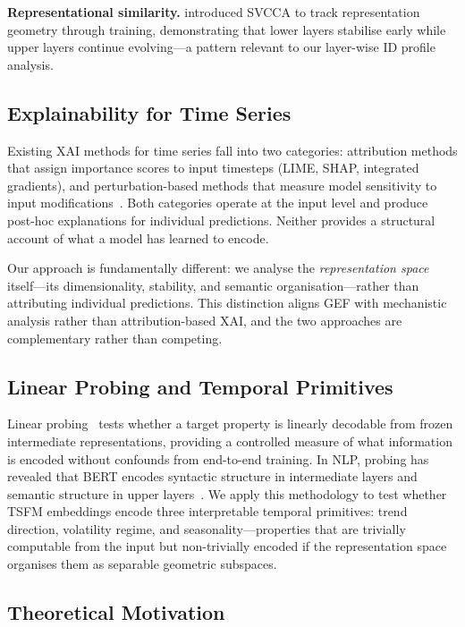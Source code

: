 \textbf{Representational similarity.}
\citet{raghu2017svcca} introduced SVCCA to track representation geometry through
training, demonstrating that lower layers stabilise early while upper layers
continue evolving---a pattern relevant to our layer-wise ID profile analysis.

\subsection{Explainability for Time Series}
\label{sec:bg_xai_ts}

Existing XAI methods for time series fall into two categories:
attribution methods that assign importance scores to input timesteps
(LIME, SHAP, integrated gradients), and perturbation-based methods that
measure model sensitivity to input modifications~\cite{ismail2020benchmarking,
theissler2022explainable}.
Both categories operate at the input level and produce post-hoc explanations
for individual predictions.
Neither provides a structural account of what a model has learned to encode.

Our approach is fundamentally different: we analyse the \emph{representation space}
itself---its dimensionality, stability, and semantic organisation---rather than
attributing individual predictions.
This distinction aligns GEF with mechanistic analysis rather than attribution-based
XAI, and the two approaches are complementary rather than competing.

\subsection{Linear Probing and Temporal Primitives}
\label{sec:bg_probing}

Linear probing~\cite{alain2017probing} tests whether a target property is linearly
decodable from frozen intermediate representations, providing a controlled
measure of what information is encoded without confounds from end-to-end training.
In NLP, probing has revealed that BERT encodes syntactic structure in intermediate
layers and semantic structure in upper layers~\cite{reif2019visualizing}.
We apply this methodology to test whether TSFM embeddings encode three
interpretable temporal primitives: trend direction, volatility regime, and
seasonality---properties that are trivially computable from the input but
non-trivially encoded if the representation space organises them as separable
geometric subspaces.

\subsection{Theoretical Motivation}
\label{sec:bg_theory}

